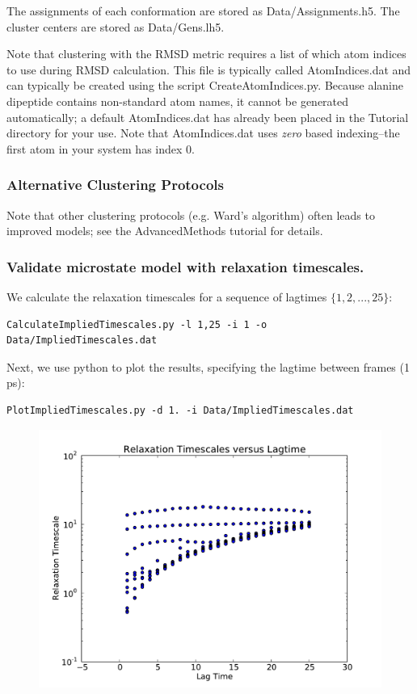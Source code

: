\documentclass[12pt]{article}
\begin{document}
The assignments of each conformation are stored as Data/Assignments.h5.  The cluster centers are stored as Data/Gens.lh5.  

Note that clustering with the RMSD metric requires a list of which atom indices to use during RMSD calculation.  This file is typically called AtomIndices.dat and can typically be created using the script CreateAtomIndices.py.  Because alanine dipeptide contains non-standard atom names, it cannot be generated automatically; a default AtomIndices.dat has already been placed in the Tutorial directory for your use.  Note that AtomIndices.dat uses \emph{zero} based indexing--the first atom in your system has index 0.  

\subsubsection{Alternative Clustering Protocols}

Note that other clustering protocols (e.g. Ward's algorithm) often leads to improved models; see the AdvancedMethods tutorial for details.  

\subsubsection{Validate microstate model with relaxation timescales.}
We calculate the relaxation timescales for a sequence of lagtimes $\{1, 2, ..., 25\}$:
\begin{verbatim}
CalculateImpliedTimescales.py -l 1,25 -i 1 -o Data/ImpliedTimescales.dat
\end{verbatim}

Next, we use python to plot the results, specifying the lagtime between frames (1 ps):  

\begin{verbatim}
PlotImpliedTimescales.py -d 1. -i Data/ImpliedTimescales.dat
\end{verbatim}

\begin{figure}
\begin{center}
\includegraphics[width=11.7cm]{figures/microstate_timescales.pdf}
\end{center}
\end{figure}
\end{document}
